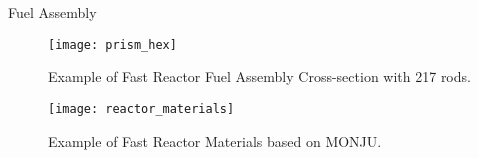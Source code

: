 \begin{frame}{Fuel Assembly}
  \begin{figure}
    \centering
    \texttt{[image: prism\_hex]}
    \caption{Example of Fast Reactor Fuel Assembly Cross-section with 217 rods.}
    \label{fig:prism_hex}
  \end{figure}
\end{frame}

\begin{frame}
  \begin{figure}
    \centering
    \texttt{[image: reactor\_materials]}
    \caption{Example of Fast Reactor Materials based on MONJU.}
    \label{fig:reactor_materials}
  \end{figure}
\end{frame}
